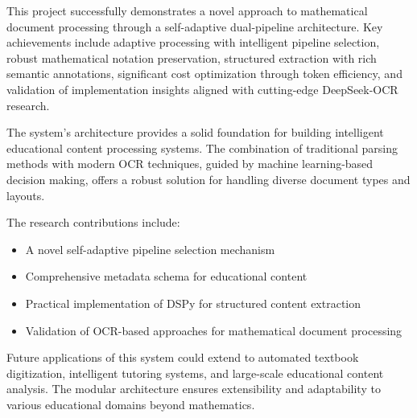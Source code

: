 \documentclass[12pt]{article}
\begin{document}
This project successfully demonstrates a novel approach to mathematical document processing through a self-adaptive dual-pipeline architecture. Key achievements include adaptive processing with intelligent pipeline selection, robust mathematical notation preservation, structured extraction with rich semantic annotations, significant cost optimization through token efficiency, and validation of implementation insights aligned with cutting-edge DeepSeek-OCR research.

The system's architecture provides a solid foundation for building intelligent educational content processing systems. The combination of traditional parsing methods with modern OCR techniques, guided by machine learning-based decision making, offers a robust solution for handling diverse document types and layouts.

The research contributions include:
\begin{itemize}
    \item A novel self-adaptive pipeline selection mechanism
    \item Comprehensive metadata schema for educational content
    \item Practical implementation of DSPy for structured content extraction
    \item Validation of OCR-based approaches for mathematical document processing
\end{itemize}

Future applications of this system could extend to automated textbook digitization, intelligent tutoring systems, and large-scale educational content analysis. The modular architecture ensures extensibility and adaptability to various educational domains beyond mathematics.
\end{document}
